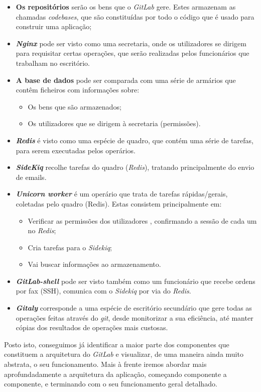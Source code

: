 \documentclass[12pt,a4paper]{article}
\begin{document}
\begin{itemize}
    \item \textbf{Os repositórios} serão os bens que o \emph{GitLab} gere. Estes armazenam as chamadas \textit{codebases}, que são constituídas por todo o código que é usado para construir uma aplicação;
    \item \textbf{\emph{Nginx}} pode ser visto como uma secretaria, onde os utilizadores se dirigem para requisitar certas operações, que serão realizadas pelos funcionários que trabalham no escritório.
    \item \textbf{A base de dados} pode ser comparada com uma série de armários que contêm ficheiros com informações sobre:
    \begin{itemize}
        \item Os bens que são armazenados;
        \item Os utilizadores que se dirigem à secretaria (permissões).
    \end{itemize}
    \item \textbf{\emph{Redis}} é visto como uma espécie de quadro, que contém uma série de tarefas, para serem executadas pelos operários.
    \item \textbf{\emph{SideKiq}} recolhe tarefas do quadro (\emph{Redis}), tratando principalmente do envio de emails.
    \item \textbf{\emph{Unicorn worker}} é um operário que trata de tarefas rápidas/gerais, coletadas pelo quadro (Redis). Estas consistem principalmente em:
    \begin{itemize}
        \item Verificar as permissões dos utilizadores , confirmando a sessão de cada um no \emph{Redis};
        \item Cria tarefas para o \emph{Sidekiq};
        \item Vai buscar informações ao armazenamento.
    \end{itemize}
    \item \textbf{\emph{GitLab-shell}} pode ser visto também como um funcionário que recebe ordens por fax (SSH), comunica com o \emph{Sidekiq} por via do \emph{Redis}.
    \item \textbf{\emph{Gitaly}} corresponde a uma espécie de escritório secundário que gere todas as operações feitas através do \emph{git}, desde monitorizar a sua eficiência, até manter cópias dos resultados de operações mais custosas.
\end{itemize}

Posto isto, conseguimos já identificar a maior parte dos componentes que constituem a arquitetura do \emph{GitLab} e visualizar, de uma maneira ainda muito abstrata, o seu funcionamento. Mais à frente iremos abordar mais aprofundadamente a arquitetura da aplicação, começando componente a componente, e terminando com o seu funcionamento geral detalhado.
\end{document}
